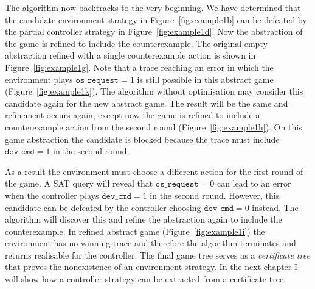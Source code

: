The algorithm now backtracks to the very beginning. We have determined that the candidate environment strategy in Figure~\ref{fig:example1b} can be defeated by the partial controller strategy in Figure~\ref{fig:example1d}. Now the abstraction of the game is refined to include the counterexample. The original empty abstraction refined with a single counterexample action is shown in Figure~\ref{fig:example1g}. Note that a trace reaching an error in which the environment plays $\texttt{os\_request} = 1$ is still possible in this abstract game (Figure~\ref{fig:example1k}). The algorithm without optimisation may consider this candidate again for the new abstract game. The result will be the same and refinement occurs again, except now the game is refined to include a counterexample action from the second round (Figure~\ref{fig:example1h}). On this game abstraction the candidate is blocked because the trace must include $\texttt{dev\_cmd} = 1$ in the second round.

As a result the environment must choose a different action for the first round of the game. A SAT query will reveal that $\texttt{os\_request} = 0$ can lead to an error when the controller plays $\texttt{dev\_cmd} = 1$ in the second round. However, this candidate can be defeated by the controller choosing $\texttt{dev\_cmd} = 0$ instead. The algorithm will discover this and refine the abstraction again to include the counterexample. In refined abstract game (Figure~\ref{fig:example1i}) the environment has no winning trace and therefore the algorithm terminates and returns realisable for the controller. The final game tree serves as a \emph{certificate tree} that proves the nonexistence of an environment strategy. In the next chapter I will show how a controller strategy can be extracted from a certificate tree.

